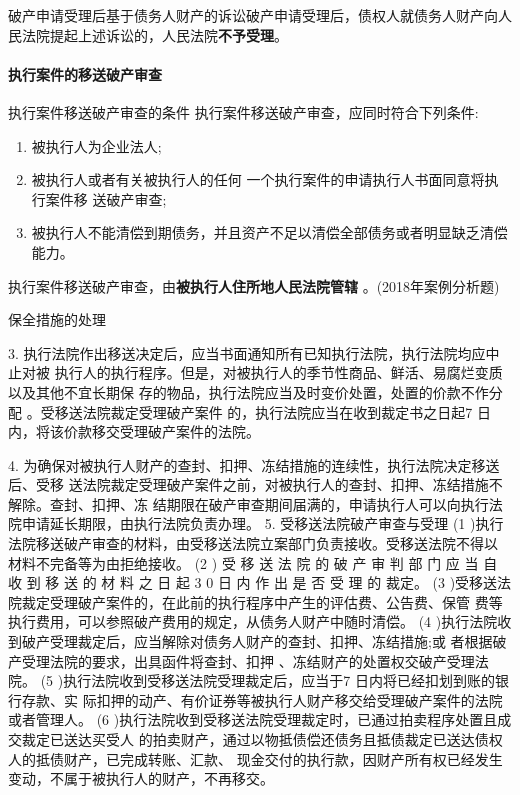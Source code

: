 \documentclass[UTF8,12pt]{ctexart}
\numberwithin{equation}{section} %
\numberwithin{figure}{section}
\numberwithin{table}{section}
\begin{document}
	破产申请受理后基于债务人财产的诉讼破产申请受理后，债权人就债务人财产向人民法院提起上述诉讼的，人民法院\textbf{不予受理}。
	
	\paragraph{执行案件的移送破产审查}
	执行案件移送破产审查的条件 执行案件移送破产审查，应同时符合下列条件:
	\begin{enumerate}
		\item 被执行人为企业法人;
		
		\item 被执行人或者有关被执行人的任何 一个执行案件的申请执行人书面同意将执行案件移 送破产审查;
		
		\item 被执行人不能清偿到期债务，并且资产不足以清偿全部债务或者明显缺乏清偿能力。 
	\end{enumerate}
	
	执行案件移送破产审查，由\textbf{被执行人住所地人民法院管辖} 。(2018年案例分析题)
	
	保全措施的处理
	
	3. 执行法院作出移送决定后，应当书面通知所有已知执行法院，执行法院均应中止对被 执行人的执行程序。但是，对被执行人的季节性商品、鲜活、易腐烂变质以及其他不宜长期保 存的物品，执行法院应当及时变价处置，处置的价款不作分配 。受移送法院裁定受理破产案件 的，执行法院应当在收到裁定书之日起7 日内，将该价款移交受理破产案件的法院。
	
	4. 为确保对被执行人财产的查封、扣押、冻结措施的连续性，执行法院决定移送后、受移 送法院裁定受理破产案件之前，对被执行人的查封、扣押、冻结措施不解除。查封、扣押、冻 结期限在破产审查期间届满的，申请执行人可以向执行法院申请延长期限，由执行法院负责办理。 5. 受移送法院破产审查与受理
	(1 )执行法院移送破产审查的材料，由受移送法院立案部门负责接收。受移送法院不得以 材料不完备等为由拒绝接收。
	(2 ) 受 移 送 法 院 的 破 产 审 判 部 门 应 当 自 收 到 移 送 的 材 料 之 日 起 3 0 日 内 作 出 是 否 受 理 的
	裁定。
	(3 )受移送法院裁定受理破产案件的，在此前的执行程序中产生的评估费、公告费、保管 费等执行费用，可以参照破产费用的规定，从债务人财产中随时清偿。
	(4 )执行法院收到破产受理裁定后，应当解除对债务人财产的查封、扣押、冻结措施;或 者根据破产受理法院的要求，出具函件将查封、扣押 、冻结财产的处置权交破产受理法院。
	 (5 )执行法院收到受移送法院受理裁定后，应当于7 日内将已经扣划到账的银行存款、实 际扣押的动产、有价证券等被执行人财产移交给受理破产案件的法院或者管理人。
	(6 )执行法院收到受移送法院受理裁定时，已通过拍卖程序处置且成交裁定已送达买受人 的拍卖财产，通过以物抵债偿还债务且抵债裁定已送达债权人的抵债财产，已完成转账、汇款、 现金交付的执行款，因财产所有权已经发生变动，不属于被执行人的财产，不再移交。
\end{document}
